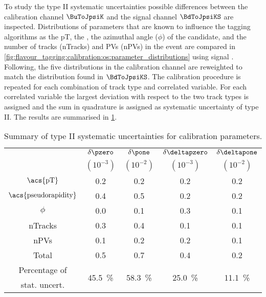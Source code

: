 To study the type II systematic uncertainties possible differences between the
calibration channel $\BuToJpsiK$ and the signal channel $\BdToJpsiKS$ are
inspected. Distributions of parameters that are known to influence the tagging
algorithms as the \acf{pT}, the \pseudorapidity, the azimuthal angle ($\phi$) of
the \Bmeson candidate, and the number of tracks (nTracks) and \aclp{PV}
(n\acsp{PV}) in the event are compared in
\cref{fig:flavour_tagging:calibration:os:parameter_distributions} using signal
\sweights. Following, the five distributions in the calibration channel are
reweighted to match the distribution found in $\BdToJpsiKS$. The calibration
procedure is repeated for each combination of track type and correlated
variable. For each correlated variable the largest deviation with respect to the
two track types is assigned and the sum in quadrature is assigned as systematic
uncertainty of type II. The results are summarised in
\cref{tab:flavour_tagging:calibration:os:systematics}.
%
\begin{table}
  \centering
  \caption{Summary of type II systematic uncertainties for \OS calibration parameters.}
  \label{tab:flavour_tagging:calibration:os:systematics}
  \begin{tabular}{ccccc}
    \toprule
      & $\delta\pzero$ & $\delta\pone$ & $\delta\deltapzero$ & $\delta\deltapone$ \\
      & $(10^{-3})$    & $(10^{-2})$   & $(10^{-3})$         & $(10^{-2})$        \\
    \midrule
    $\text{\acs{pT}}$             & 0.2 & 0.2 & 0.2 & 0.2 \\
    $\text{\acs{pseudorapidity}}$ & 0.4 & 0.5 & 0.2 & 0.2 \\
    $\phi$                        & 0.0 & 0.1 & 0.3 & 0.1 \\
    nTracks                       & 0.3 & 0.4 & 0.1 & 0.1 \\
    nPVs                          & 0.1 & 0.2 & 0.2 & 0.1 \\
    \midrule
      Total                       & 0.5 & 0.7 & 0.4 & 0.2 \\
    \midrule
    Percentage of & 
    \multirow{2}[2]{*}{\SI{45.5}{\percent}} & 
    \multirow{2}[2]{*}{\SI{58.3}{\percent}} & 
    \multirow{2}[2]{*}{\SI{25.0}{\percent}} & 
    \multirow{2}[2]{*}{\SI{11.1}{\percent}} \\
    stat. uncert. \\
    \bottomrule
  \end{tabular}
\end{table}
